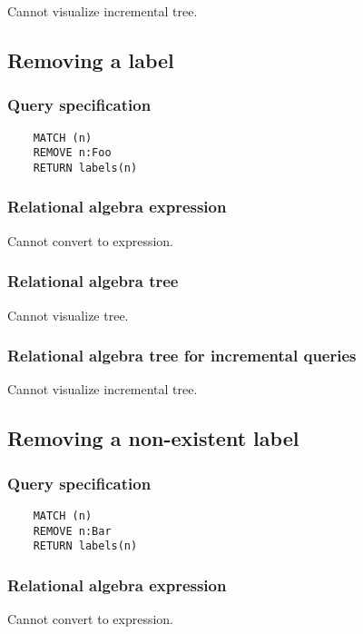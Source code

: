 	Cannot visualize incremental tree.
	\subsection{Removing a label}

	\subsubsection*{Query specification}

	\begin{lstlisting}
	MATCH (n)
	REMOVE n:Foo
	RETURN labels(n)
	\end{lstlisting}


	\subsubsection*{Relational algebra expression}

	Cannot convert to expression.

	\subsubsection*{Relational algebra tree}

	Cannot visualize tree.

	\subsubsection*{Relational algebra tree for incremental queries}

	Cannot visualize incremental tree.
	\subsection{Removing a non-existent label}

	\subsubsection*{Query specification}

	\begin{lstlisting}
	MATCH (n)
	REMOVE n:Bar
	RETURN labels(n)
	\end{lstlisting}


	\subsubsection*{Relational algebra expression}

	Cannot convert to expression.


